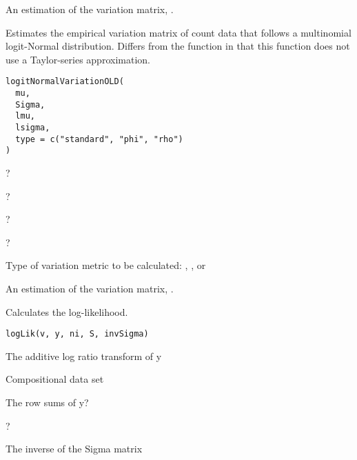 \documentclass[a4paper]{book}
\begin{document}
%
\begin{Value}
An estimation of the variation matrix, .
\end{Value}
%
\begin{Description}\relax
Estimates the empirical variation matrix of count data that follows a multinomial 
logit-Normal distribution. Differs from the function 
in that this function does not use a Taylor-series approximation.
\end{Description}
%
\begin{Usage}
\begin{verbatim}
logitNormalVariationOLD(
  mu,
  Sigma,
  lmu,
  lsigma,
  type = c("standard", "phi", "rho")
)
\end{verbatim}
\end{Usage}
%
\begin{Arguments}
\begin{ldescription}
\item[\code{mu}] ?

\item[\code{Sigma}] ?

\item[\code{lmu}] ?

\item[\code{lsigma}] ?

\item[\code{type}] Type of variation metric to be calculated: , ,
or 
\end{ldescription}
\end{Arguments}
%
\begin{Value}
An estimation of the variation matrix, .
\end{Value}
%
\begin{Description}\relax
Calculates the log-likelihood.
\end{Description}
%
\begin{Usage}
\begin{verbatim}
logLik(v, y, ni, S, invSigma)
\end{verbatim}
\end{Usage}
%
\begin{Arguments}
\begin{ldescription}
\item[\code{v}] The additive log ratio transform of y

\item[\code{y}] Compositional data set

\item[\code{ni}] The row sums of y?

\item[\code{S}] ?

\item[\code{invSigma}] The inverse of the Sigma matrix
\end{ldescription}
\end{Arguments}
\end{document}
